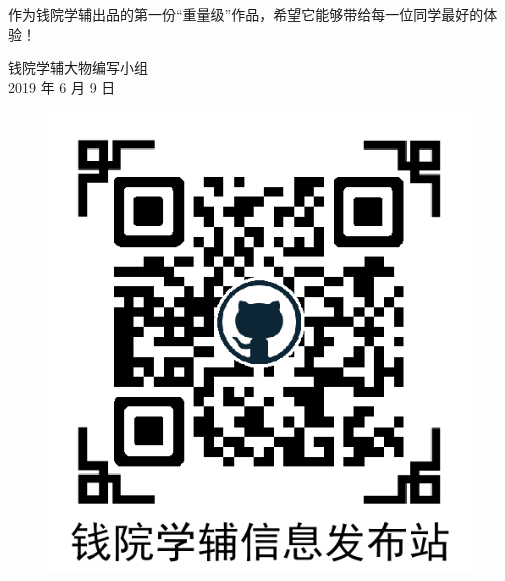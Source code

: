 \documentclass[b5paper,opensource,sourcefont,parskip]{qyxf-book}
\begin{document}
作为钱院学辅出品的第一份“重量级”作品，希望它能够带给每一位同学最好的体验！

\begin{flushright}
钱院学辅大物编写小组\\
2019 年 6 月 9 日
\end{flushright}
\vspace{1.0cm}
\begin{figure}[!h]
	\centering
	\begin{minipage}[c]{0.5\textwidth}
		\centering
		\includegraphics[scale=0.5]{qrcode2.png}
	\end{minipage}%
	\begin{minipage}[c]{0.5\textwidth}
		\centering

\end{minipage}
\end{figure}
\end{document}
